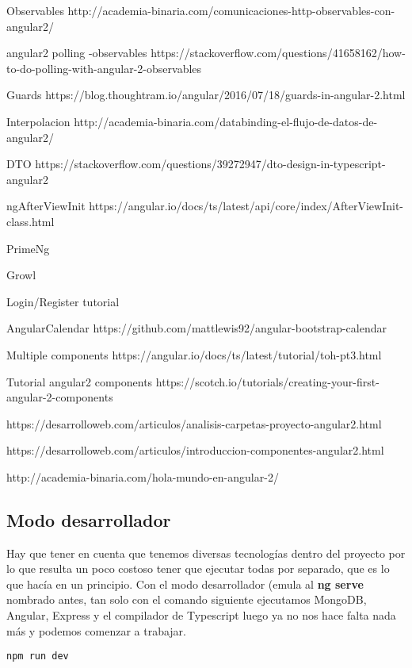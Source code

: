 Observables
http://academia-binaria.com/comunicaciones-http-observables-con-angular2/

angular2 polling -observables
https://stackoverflow.com/questions/41658162/how-to-do-polling-with-angular-2-observables

Guards
https://blog.thoughtram.io/angular/2016/07/18/guards-in-angular-2.html

Interpolacion
http://academia-binaria.com/databinding-el-flujo-de-datos-de-angular2/

DTO
https://stackoverflow.com/questions/39272947/dto-design-in-typescript-angular2

ngAfterViewInit
https://angular.io/docs/ts/latest/api/core/index/AfterViewInit-class.html


PrimeNg

Growl

Login/Register tutorial

AngularCalendar
https://github.com/mattlewis92/angular-bootstrap-calendar

Multiple components
https://angular.io/docs/ts/latest/tutorial/toh-pt3.html

Tutorial angular2 components
https://scotch.io/tutorials/creating-your-first-angular-2-components

https://desarrolloweb.com/articulos/analisis-carpetas-proyecto-angular2.html


https://desarrolloweb.com/articulos/introduccion-componentes-angular2.html

http://academia-binaria.com/hola-mundo-en-angular-2/


\subsection{Modo desarrollador}

Hay que tener en cuenta que tenemos diversas tecnologías dentro del proyecto por lo que resulta un poco costoso tener que ejecutar todas por separado, que es lo que hacía en un principio. Con el modo desarrollador (emula al \textbf{ng serve} nombrado antes, tan solo con el comando siguiente ejecutamos MongoDB, Angular, Express y el compilador de Typescript luego ya no nos hace falta nada más y podemos comenzar a trabajar. 

	\lstset{language=C, breaklines=true, basicstyle=\footnotesize}
		\begin{lstlisting}[frame=single]
		npm run dev
    	\end{lstlisting}

